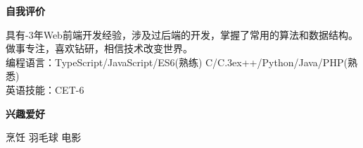 \documentclass[a4paper]{article}
\newenvironment{changemargin}[2]{%
  \begin{list}{}{%
    \setlength{\topsep}{0pt}%
    \setlength{\leftmargin}{#1}%
    \setlength{\rightmargin}{#2}%
    \setlength{\listparindent}{\parindent}%
    \setlength{\itemindent}{\parindent}%
    \setlength{\parsep}{\parskip}%
  }%
  \item[]}{\end{list}
}
\newcommand{\lineover}{
	\begin{changemargin}{-0.05in}{-0.05in}
		\vspace*{-8pt}
		\hrulefill \\
		\vspace*{-2pt}
	\end{changemargin}
}
\newcommand{\header}[1]{
	\begin{changemargin}{-0.5in}{-0.5in}
	\fontsize{12}{14} \scshape{\textbf{#1}}\\
	\end{changemargin}
}
\newenvironment{body} {
	\vspace*{-16pt}
	\begin{changemargin}{-0.5in}{-0.5in}
  }	
	{\end{changemargin}
}
\begin{document}



\header{自我评价}

\begin{body}
	\vspace{14pt}
	具有{-3}年{\fontarial Web}前端开发经验，涉及过后端的开发，掌握了常用的算法和数据结构。\\
	做事专注，喜欢钻研，相信技术改变世界。\\
	编程语言：{\fontarial TypeScript/JavaScript/ES6}(熟练) {\fontarial C/C\raise.3ex\hbox{\small++}/Python/Java/PHP}(熟悉)\\
	英语技能：{\fontarial CET-6}\\
\end{body}

\medskip





\header{兴趣爱好}

\begin{body}
	\vspace{14pt}
	烹饪 羽毛球 电影\\
\end{body}
\end{document}

